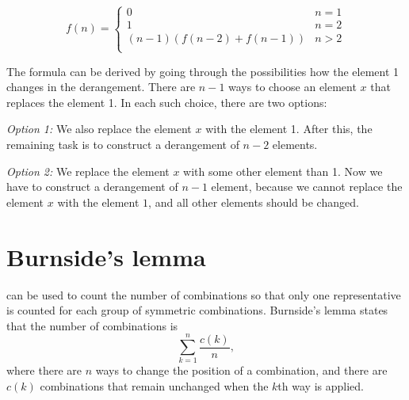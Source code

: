 \begin{equation*}
    f(n) = \begin{cases}
               0               & n = 1\\
               1               & n = 2\\
               (n-1)(f(n-2) + f(n-1)) & n>2 \\
           \end{cases}
\end{equation*}

The formula can be derived by going through
the possibilities how the element 1 changes
in the derangement.
There are $n-1$ ways to choose an element $x$
that replaces the element 1.
In each such choice, there are two options:

\textit{Option 1:} We also replace the element $x$
with the element 1.
After this, the remaining task is to construct
a derangement of $n-2$ elements.

\textit{Option 2:} We replace the element $x$
with some other element than 1.
Now we have to construct a derangement
of $n-1$ element, because we cannot replace
the element $x$ with the element $1$, and all other
elements should be changed.

\section{Burnside's lemma}


 can be used to count
the number of combinations so that
only one representative is counted
for each group of symmetric combinations.
Burnside's lemma states that the number of
combinations is
\[\sum_{k=1}^n \frac{c(k)}{n},\]
where there are $n$ ways to change the
position of a combination,
and there are $c(k)$ combinations that
remain unchanged when the $k$th way is applied.

